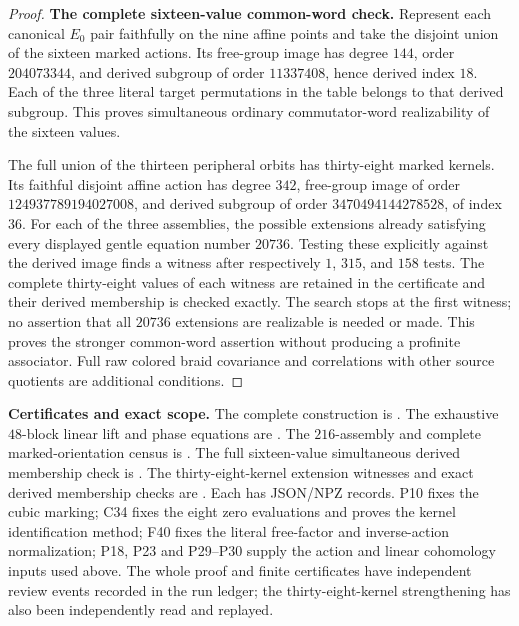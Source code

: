 \begin{proof}
\medskip\noindent\textbf{The complete sixteen-value common-word check.}\quad
Represent each canonical $E_0$ pair faithfully on the nine
affine points and take the disjoint union of the sixteen
marked actions. Its free-group image has degree $144$,
order $204073344$, and derived subgroup of order
$11337408$, hence derived index $18$.
Each of the three literal target permutations in the table
belongs to that derived subgroup. This proves simultaneous
ordinary commutator-word realizability of the sixteen values.

The full union of the thirteen peripheral orbits has
thirty-eight marked kernels. Its faithful disjoint affine
action has degree $342$, free-group image of order
$124937789194027008$, and derived subgroup of order
$3470494144278528$, of index $36$.
For each of the three assemblies, the possible extensions
already satisfying every displayed gentle equation number
$20736$. Testing these explicitly against the derived image
finds a witness after respectively $1$, $315$, and $158$
tests. The complete thirty-eight values of each witness are
retained in the certificate and their derived membership
is checked exactly. The search stops at the first witness;
no assertion that all $20736$ extensions are realizable is
needed or made. This proves the stronger common-word
assertion without producing a profinite associator.
Full raw colored braid covariance and correlations with
other source quotients are additional conditions.
\end{proof}

\medskip\noindent\textbf{Certificates and exact scope.}\quad
The complete construction is
.
The exhaustive $48$-block linear lift and phase equations are
.
The $216$-assembly and complete marked-orientation census is
.
The full sixteen-value simultaneous derived membership check is
.
The thirty-eight-kernel extension witnesses and exact derived
membership checks are
.
Each has JSON/NPZ records. P10 fixes the cubic marking;
C34 fixes the eight zero evaluations and proves the kernel
identification method; F40 fixes the literal free-factor
and inverse-action normalization; P18, P23 and P29--P30
supply the action and linear cohomology inputs used above.
The whole proof and finite certificates have independent review events recorded in the run ledger; the thirty-eight-kernel strengthening has also been independently read and replayed.
